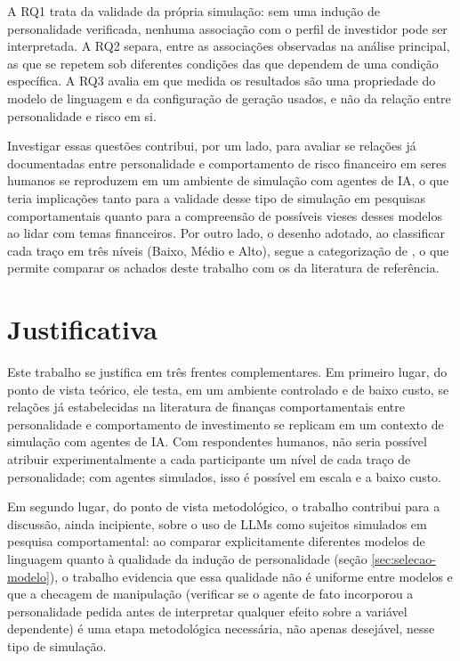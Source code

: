 A RQ1 trata da validade da própria simulação: sem uma indução de
personalidade verificada, nenhuma associação com o perfil de investidor
pode ser interpretada. A RQ2 separa, entre as associações observadas na
análise principal, as que se repetem sob diferentes condições das que
dependem de uma condição específica. A RQ3 avalia em que medida os
resultados são uma propriedade do modelo de linguagem e da configuração
de geração usados, e não da relação entre personalidade e risco em si.

Investigar essas questões contribui, por um lado, para avaliar se relações
já documentadas entre personalidade e comportamento de risco financeiro em
seres humanos se reproduzem em um ambiente de simulação com agentes de IA,
o que teria implicações tanto para a validade desse tipo de simulação
em pesquisas comportamentais quanto para a compreensão de possíveis vieses
desses modelos ao lidar com temas financeiros. Por outro lado, o desenho
adotado, ao classificar cada traço em três níveis (Baixo, Médio e Alto),
segue a categorização de , o que permite
comparar os achados deste trabalho com os da literatura de referência.

\section{Justificativa}
\label{sec:justificativa}

Este trabalho se justifica em três frentes complementares. Em primeiro
lugar, do ponto de vista teórico, ele testa, em um ambiente controlado e de
baixo custo, se relações já estabelecidas na literatura de finanças
comportamentais entre personalidade e comportamento de investimento se
replicam em um contexto de simulação com agentes de IA. Com respondentes
humanos, não seria possível atribuir experimentalmente a cada participante
um nível de cada traço de personalidade; com agentes simulados, isso é
possível em escala e a baixo custo.

Em segundo lugar, do ponto de vista metodológico, o trabalho contribui
para a discussão, ainda incipiente, sobre o uso de LLMs como sujeitos
simulados em pesquisa comportamental: ao comparar explicitamente diferentes
modelos de linguagem quanto à qualidade da indução de personalidade (seção
\ref{sec:selecao-modelo}), o trabalho evidencia que essa qualidade não é
uniforme entre modelos e que a checagem de manipulação (verificar se o
agente de fato incorporou a personalidade pedida antes de interpretar
qualquer efeito sobre a variável dependente) é uma etapa metodológica
necessária, não apenas desejável, nesse tipo de simulação.


